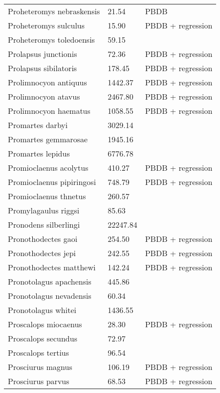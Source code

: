 \documentclass{article}
\begin{document}
\begin{center}
\begin{longtable}{p{} p{} p{}}
    Proheteromys nebraskensis & 21.54 & PBDB \\ 
    Proheteromys sulculus & 15.90 & PBDB + regression \\ 
    Proheteromys toledoensis & 59.15 & \cite{Tomiya2013} \\ 
    Prolapsus junctionis & 72.36 & PBDB + regression \\ 
    Prolapsus sibilatoris & 178.45 & PBDB + regression \\ 
    Prolimnocyon antiquus & 1442.37 & PBDB + regression \\ 
    Prolimnocyon atavus & 2467.80 & PBDB + regression \\ 
    Prolimnocyon haematus & 1058.55 & PBDB + regression \\ 
    Promartes darbyi & 3029.14 & \cite{Dawson2007} \\ 
    Promartes gemmarosae & 1945.16 & \cite{Dawson2007} \\ 
    Promartes lepidus & 6776.78 & \cite{Mora2005} \\ 
    Promioclaenus acolytus & 410.27 & PBDB + regression \\ 
    Promioclaenus pipiringosi & 748.79 & PBDB + regression \\ 
    Promioclaenus thnetus & 260.57 & \cite{Gazin1930} \\ 
    Promylagaulus riggsi & 85.63 & \cite{Tomiya2013} \\ 
    Pronodens silberlingi & 22247.84 & \cite{Tomiya2013} \\ 
    Pronothodectes gaoi & 254.50 & PBDB + regression \\ 
    Pronothodectes jepi & 242.55 & PBDB + regression \\ 
    Pronothodectes matthewi & 142.24 & PBDB + regression \\ 
    Pronotolagus apachensis & 445.86 & \cite{Tomiya2013} \\ 
    Pronotolagus nevadensis & 60.34 & \cite{Tomiya2013} \\ 
    Pronotolagus whitei & 1436.55 & \cite{Tomiya2013} \\ 
    Proscalops miocaenus & 28.30 & PBDB + regression \\ 
    Proscalops secundus & 72.97 & \cite{Tomiya2013} \\ 
    Proscalops tertius & 96.54 & \cite{Tomiya2013} \\ 
    Prosciurus magnus & 106.19 & PBDB + regression \\ 
    Prosciurus parvus & 68.53 & PBDB + regression \\ 

\end{longtable}
\end{center}
\end{document}
